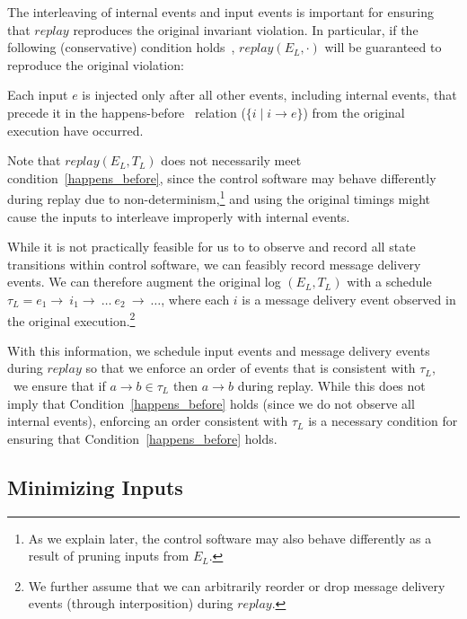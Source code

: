 The interleaving of internal events and input events is important for ensuring that $replay$ reproduces the
original invariant violation. In particular, if the following (conservative) condition holds~\cite{tel2000introduction}, $replay(E_L, \cdot)$ will be
guaranteed to reproduce the original violation:

\begin{condition}
\label{happens_before}
Each input $e$ is injected only after all other events, including internal events, that precede it in the
happens-before~\cite{Lamport:1978:TCO:359545.359563} relation ($\{i \mid i \rightarrow e\}$) from the
original execution have occurred.
\end{condition}

\noindent Note that $replay(E_L, T_L)$ does not necessarily meet
condition~\ref{happens_before}, since the control software may behave
differently during replay due to non-determinism,\footnote{As we explain
later, the control software may also behave differently as a result of
pruning inputs from $E_L$.} and using the original timings might
cause the inputs to interleave improperly with internal events.

While it is not practically feasible for us to to observe and record all state
transitions within control software, we can feasibly record message delivery
events. We can therefore augment the original log $(E_L, T_L)$ with a schedule
$\tau_L = e_1\rightarrow~i_1\rightarrow~\dots~e_2~\rightarrow~\dots$, where
each $i$ is a message delivery event observed in the original
execution.\footnote{We further assume that we can arbitrarily reorder or
drop message delivery events (through interposition) during $replay$.}

With this information, we schedule input events and message delivery
events during $replay$ so that we enforce an order
of events that is consistent with $\tau_L$, \ie~we ensure that
if $a \rightarrow b\in \tau_L$ then $a \rightarrow b$ during replay.
While this does not imply that
Condition~\ref{happens_before} holds (since we do not observe all internal
events), enforcing an order consistent with
$\tau_L$ is a necessary condition for ensuring that
Condition~\ref{happens_before} holds.

\subsection{Minimizing Inputs}

